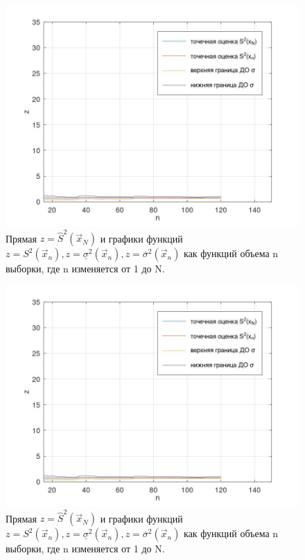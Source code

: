 \begin{figure}[H]
	\centering
	\includegraphics[scale=0.4]{assets/g2-1.jpg}
	\caption{Прямая $z=\hat S^2 (\vec x_N)$ и графики функций $z= S^2 (\vec x_n), z= \underline \sigma^2 (\vec x_n), z =\overline \sigma^2 (\vec x_n)$ как функций объема n выборки, где n изменяется от 1 до N.}
\end{figure}

\begin{figure}[H]
	\centering
	\includegraphics[scale=0.4]{assets/g2-2.jpg}
	\caption{Прямая $z=\hat S^2 (\vec x_N)$ и графики функций $z= S^2 (\vec x_n), z= \underline \sigma^2 (\vec x_n), z =\overline \sigma^2 (\vec x_n)$ как функций объема n выборки, где n изменяется от 1 до N.}
\end{figure}